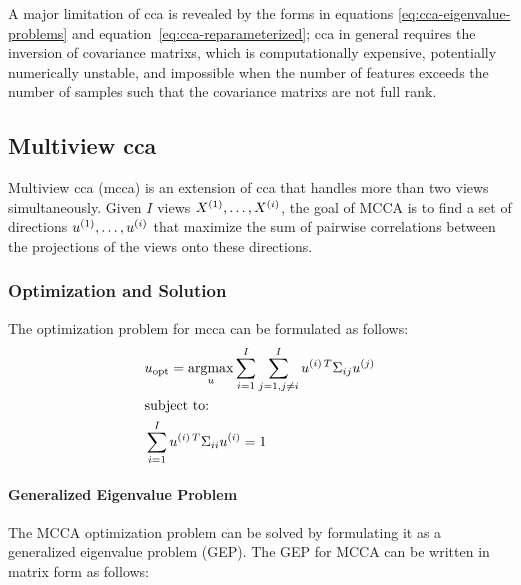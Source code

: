 A major limitation of \acrshort{cca} is revealed by the forms in equations \ref{eq:cca-eigenvalue-problems} and equation~\ref{eq:cca-reparameterized}; \acrshort{cca} in general requires the inversion of  \glspl{covariance matrix}, which is computationally expensive, potentially numerically unstable, and impossible when the number of features exceeds the number of samples such that the  \glspl{covariance matrix} are not full rank.

\subsection{Multiview \acrshort{cca}}

Multiview \acrshort{cca} (\acrshort{mcca}) is an extension of \acrshort{cca} that handles more than two \gls{views} simultaneously. Given $I$ \gls{views} $X^{(1)}, \dots, X^{(i)}$, the goal of MCCA is to find a set of directions $u^{(1)}, \dots, u^{(i)}$ that maximize the sum of pairwise correlations between the projections of the \gls{views} onto these directions.
\subsubsection{Optimization and Solution}

The optimization problem for \acrshort{mcca} can be formulated as follows:
\begin{align}
    & u_{\text{opt}} = \underset{u}{\mathrm{argmax}} \sum_{i=1}^{I} \sum_{j=1, j \neq i}^{I} u^{(i)\,T} \Sigma_{ij} u^{(j)} \\
    & \text{subject to:} \notag                                                                                               \\
    & \sum_{i=1}^{I} u^{(i)\,T} \Sigma_{ii} u^{(i)} = 1 \notag
\end{align}

\paragraph{Generalized Eigenvalue Problem}

The MCCA optimization problem can be solved by formulating it as a generalized eigenvalue problem (GEP). The GEP for MCCA can be written in matrix form as follows:


